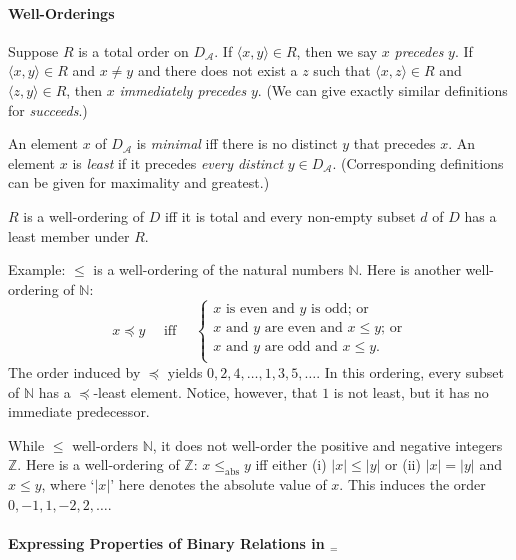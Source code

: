 \paragraph{Well-Orderings}

Suppose $R$ is a total order on $D_{\mathscr{A}}$. If $\langle x,y\rangle\in R$, then we say $x$ \emph{precedes} $y$. If $\langle x,y\rangle \in R$ and $x\neq y$ and there does not exist a $z$ such that $\langle x,z\rangle \in R$ and $\langle z,y\rangle \in R$, then $x$ \emph{immediately precedes} $y$. (We can give exactly similar definitions for \emph{succeeds}.)

An element $x$ of $D_{\mathscr{A}}$ is \emph{minimal} iff there is no distinct $y$ that precedes $x$. An element $x$ is \emph{least} if it precedes \emph{every distinct} $y \in D_{\mathscr{A}}$. (Corresponding definitions can be given for maximality and greatest.)

\begin{definition}
  $R$ is a well-ordering of $D$ iff it is total and every non-empty subset $d$ of $D$ has a least member under $R$.
\end{definition} Example: $\leqslant$ is a well-ordering of the natural numbers $\mathbb{N}$. Here is another well-ordering of $\mathbb{N}$: \begin{equation}
  x \preccurlyeq y \quad\text{ iff }\quad \begin{cases}
    \text{$x$ is even and $y$ is odd; or}\\
    \text{$x$ and $y$ are even and $x\leqslant y$; or}\\
    \text{$x$ and $y$ are odd and $x\leqslant y$}.\\
  \end{cases}
\end{equation} The order induced by $\preccurlyeq$ yields $0, 2, 4, \ldots, 1, 3, 5, \ldots$. In this ordering, every subset of $\mathbb{N}$ has a $\preccurlyeq$-least element. Notice, however, that $1$ is not least, but it has no immediate predecessor. 

While $\leqslant$ well-orders $\mathbb{N}$, it does not well-order the positive and negative integers $\mathbb{Z}$. Here is a well-ordering of $\mathbb{Z}$: $x \leqslant_{\text{abs}} y$ iff either (i) $|x|\leqslant |y|$ or (ii) $|x|=|y|$ and $x\leqslant y$, where `$|x|$' here denotes the absolute value of $x$.  This induces the order $0,-1,1,-2,2,\ldots$.


 
 \paragraph{Expressing Properties of Binary Relations in \ltwo$_{=}$}
 
